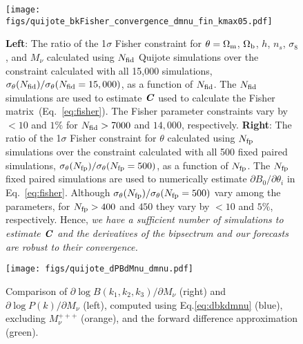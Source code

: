 \documentclass[12pt, letterpaper, preprint]{aastex62}
\newcommand{\Om}{\Omega_{\rm m}}
\newcommand{\Ob}{\Omega_{\rm b}}
\newcommand{\smnu}{M_\nu}
\newcommand{\sig}{\sigma_8}
\newcommand{\bfi}[1]{\textbf{\textit{#1}}}
\begin{document}
\begin{figure}
\begin{center}
    \texttt{[image: figs/quijote\_bkFisher\_convergence\_dmnu\_fin\_kmax05.pdf]}
    \caption{{\bf Left}: The ratio of the 1$\sigma$ Fisher constraint for $\theta=\Om$, 
    $\Ob$, $h$, $n_s$, $\sig$, and $\smnu$ calculated using $N_{\rm fid}$ Quijote 
    simulations over the constraint calculated with all 15,000 simulations, 
    $\sigma_\theta(N_{\rm fid})/\sigma_\theta(N_{\rm fid} = 15,000)$, as a 
    function of $N_{\rm fid}$. The $N_{\rm fid}$ simulations are used to estimate 
    $\bfi{C}$ used to calculate the Fisher matrix~(Eq.~\ref{eq:fisher}). The Fisher
    parameter constraints vary by $<10$ and $1\%$ for $N_{\rm fid} > 7000$ and 
    $14,000$, respectively. 
    {\bf Right}: The ratio of the 1$\sigma$ Fisher constraint for $\theta$ 
    calculated using  $N_{\rm fp}$ simulations over the constraint calculated with 
    all 500 fixed paired simulations, $\sigma_\theta(N_{\rm fp})/\sigma_\theta(N_{\rm fp} = 500)$, 
    as a function of $N_{\rm fp}$. The $N_{\rm fp}$ fixed paired simulations are 
    used to numerically estimate $\partial B_0/\partial \theta_i$ in Eq.~\ref{eq:fisher}. 
    Although $\sigma_\theta(N_{\rm fp})/\sigma_\theta(N_{\rm fp} = 500)$ vary among 
    the parameters, for $N_{\rm fp} > 400$ and $450$ they vary by $< 10$ and $5\%$, 
    respectively. Hence, {\em we have a sufficient number of simulations to estimate 
    $\bfi{C}$ and the derivatives of the bipsectrum and our forecasts are robust to 
    their convergence.} 
    }
\label{fig:converge}
\end{center}
\end{figure}

\begin{figure}
\begin{center}
    \texttt{[image: figs/quijote\_dPBdMnu\_dmnu.pdf]} 
    \caption{Comparison of $\partial \log B(k_1, k_2, k_3)/\partial M_\nu$ (right) 
    and $\partial \log P(k)/\partial M_\nu$ (left), computed using Eq.\ref{eq:dbkdmnu} (blue), 
    excluding $\smnu^{+++}$ (orange), and the forward difference approximation (green). 
    }
\label{fig:dPBdmnu}
\end{center}
\end{figure}

 
\end{document}

